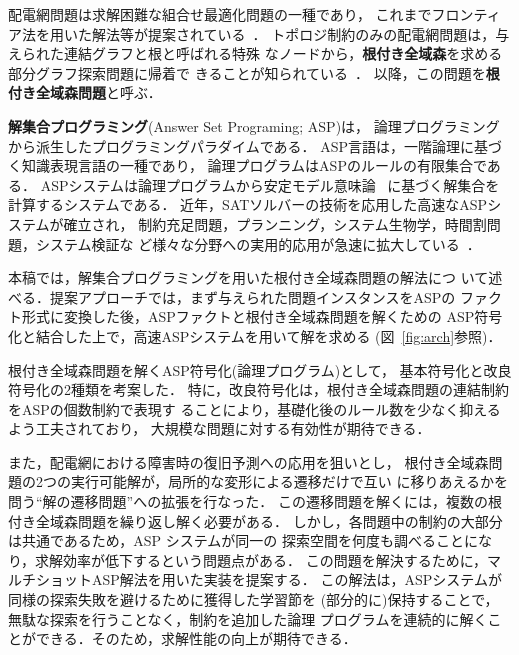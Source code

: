 配電網問題は求解困難な組合せ最適化問題の一種であり，
これまでフロンティア法を用いた解法等が提案されている~\cite{Minato:dnet:ZDD}．
トポロジ制約のみの配電網問題は，与えられた連結グラフと根と呼ばれる特殊
なノードから，\textbf{根付き全域森}を求める部分グラフ探索問題に帰着で
きることが知られている~\cite{Minato:dnet:netuki}．
以降，この問題を\textbf{根付き全域森問題}と呼ぶ．

\textbf{解集合プログラミング}(Answer Set Programing; ASP\cite{%
  Baral03:cambridge,%
  Gelfond88:iclp,%
  Inoue08:jssst,%
  Niemela99:amai})は，
論理プログラミングから派生したプログラミングパラダイムである．
ASP言語は，一階論理に基づく知識表現言語の一種であり，
論理プログラムはASPのルールの有限集合である．
ASPシステムは論理プログラムから安定モデル意味論~\cite{Gelfond88:iclp}
に基づく解集合を計算するシステムである．
近年，SATソルバーの技術を応用した高速なASPシステムが確立され，
制約充足問題，プランニング，システム生物学，時間割問題，システム検証な
ど様々な分野への実用的応用が急速に拡大している~\cite{ASPAISAT}．

本稿では，解集合プログラミングを用いた根付き全域森問題の解法につ
いて述べる．提案アプローチでは，まず与えられた問題インスタンスをASPの
ファクト形式に変換した後，ASPファクトと根付き全域森問題を解くための
ASP符号化と結合した上で，高速ASPシステムを用いて解を求める
(図~\ref{fig:arch}参照)．

根付き全域森問題を解くASP符号化(論理プログラム)として，
基本符号化と改良符号化の2種類を考案した．
特に，改良符号化は，根付き全域森問題の連結制約をASPの個数制約で表現す
ることにより，基礎化後のルール数を少なく抑えるよう工夫されており，
大規模な問題に対する有効性が期待できる．

また，配電網における障害時の復旧予測への応用を狙いとし，
根付き全域森問題の2つの実行可能解が，局所的な変形による遷移だけで互い
に移りあえるかを問う``解の遷移問題''への拡張を行なった．
この遷移問題を解くには，複数の根付き全域森問題を繰り返し解く必要がある．
しかし，各問題中の制約の大部分は共通であるため，ASP システムが同一の
探索空間を何度も調べることになり，求解効率が低下するという問題点がある．
この問題を解決するために，マルチショットASP解法を用いた実装を提案する．
この解法は，ASPシステムが同様の探索失敗を避けるために獲得した学習節を
(部分的に)保持することで，無駄な探索を行うことなく，制約を追加した論理
プログラムを連続的に解くことができる．そのため，求解性能の向上が期待できる．

